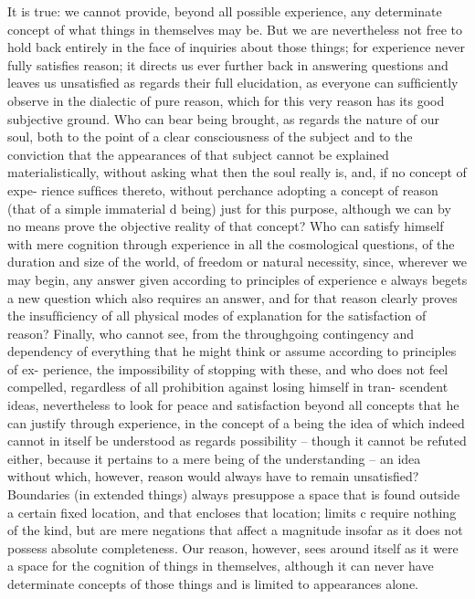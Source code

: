 It is true: we cannot provide, beyond all possible experience, any
determinate concept of what things in themselves may be. But we are
nevertheless not free to hold back entirely in the face of inquiries about
those things; for experience never fully satisﬁes reason; it directs us ever
further back in answering questions and leaves us unsatisﬁed as regards
their full elucidation, as everyone can sufﬁciently observe in the dialectic
of pure reason, which for this very reason has its good subjective ground.
Who can bear being brought, as regards the nature of our soul, both to
the point of a clear consciousness of the subject and to the conviction
that the appearances of that subject cannot be explained materialistically,
without asking what then the soul really is, and, if no concept of expe-
rience sufﬁces thereto, without perchance adopting a concept of reason
(that of a simple immaterial d being) just for this purpose, although we can
by no means prove the objective reality of that concept? Who can satisfy
himself with mere cognition through experience in all the cosmological
questions, of the duration and size of the world, of freedom or natural
necessity, since, wherever we may begin, any answer given according
to principles of experience e always begets a new question which also
requires an answer, and for that reason clearly proves the insufﬁciency
of all physical modes of explanation for the satisfaction of reason? Finally,
who cannot see, from the throughgoing contingency and dependency of
everything that he might think or assume according to principles of ex-
perience, the impossibility of stopping with these, and who does not feel
compelled, regardless of all prohibition against losing himself in tran-
scendent ideas, nevertheless to look for peace and satisfaction beyond
all concepts that he can justify through experience, in the concept of a
being the idea of which indeed cannot in itself be understood as regards
possibility – though it cannot be refuted either, because it pertains to
a mere being of the understanding – an idea without which, however,
reason would always have to remain unsatisﬁed?
Boundaries (in extended things) always presuppose a space that is
found outside a certain ﬁxed location, and that encloses that location;
limits c require nothing of the kind, but are mere negations that affect
a magnitude insofar as it does not possess absolute completeness. Our
reason, however, sees around itself as it were a space for the cognition of
things in themselves, although it can never have determinate concepts
of those things and is limited to appearances alone.
